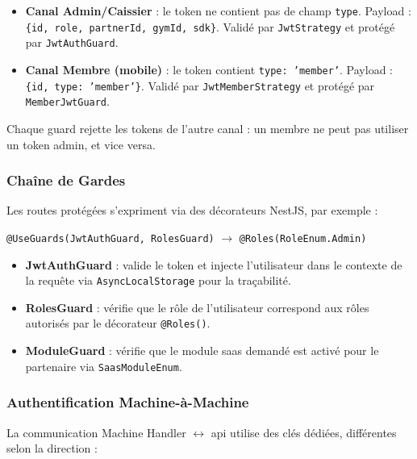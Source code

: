 \documentclass[../main.tex]{subfiles}
\begin{document}
\begin{itemize}
    \item \textbf{Canal Admin/Caissier} : le token ne contient pas de champ \texttt{type}. Payload : \texttt{\{id, role, partnerId, gymId, sdk\}}. Valid\'{e} par \texttt{JwtStrategy} et prot\'{e}g\'{e} par \texttt{JwtAuthGuard}.
    \item \textbf{Canal Membre (mobile)} : le token contient \texttt{type: 'member'}. Payload : \texttt{\{id, type: 'member'\}}. Valid\'{e} par \texttt{JwtMemberStrategy} et prot\'{e}g\'{e} par \texttt{MemberJwtGuard}.
\end{itemize}

Chaque guard rejette les tokens de l'autre canal : un membre ne peut pas utiliser un token admin, et vice versa.

\subsubsection{Cha\^{i}ne de Gardes}

Les routes prot\'{e}g\'{e}es s'expriment via des d\'{e}corateurs NestJS, par exemple :

\begin{center}
    \texttt{@UseGuards(JwtAuthGuard, RolesGuard)} $\rightarrow$ \texttt{@Roles(RoleEnum.Admin)}
\end{center}

\begin{itemize}
    \item \textbf{JwtAuthGuard} : valide le token et injecte l'utilisateur dans le contexte de la requ\^{e}te via \texttt{AsyncLocalStorage} pour la tra\c{c}abilit\'{e}.
    \item \textbf{RolesGuard} : v\'{e}rifie que le r\^{o}le de l'utilisateur correspond aux r\^{o}les autoris\'{e}s par le d\'{e}corateur \texttt{@Roles()}.
    \item \textbf{ModuleGuard} : v\'{e}rifie que le module \acrshort{saas} demand\'{e} est activ\'{e} pour le partenaire via \texttt{SaasModuleEnum}.
\end{itemize}

\subsubsection{Authentification Machine-\`{a}-Machine}

La communication Machine Handler $\leftrightarrow$ \acrshort{api} utilise des cl\'{e}s d\'{e}di\'{e}es, diff\'{e}rentes selon la direction :
\end{document}
